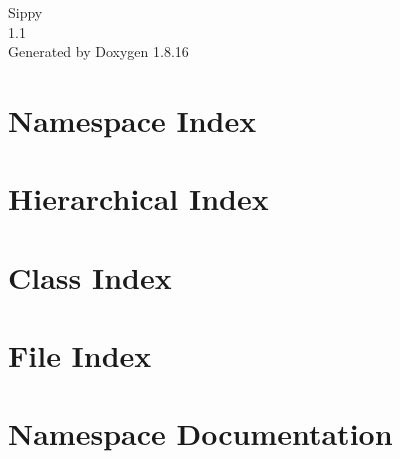 \let\mypdfximage\pdfximage\def\pdfximage{\immediate\mypdfximage}\documentclass[twoside]{book}
\newcommand{\+}{\discretionary{\mbox{\scriptsize$\hookleftarrow$}}{}{}}
\newcommand{\clearemptydoublepage}{%
  \newpage{\pagestyle{empty}\cleardoublepage}%
}
\begin{document}
\hypersetup{pageanchor=false,
             bookmarksnumbered=true,
             pdfencoding=unicode
            }
\begin{titlepage}
\vspace*{7cm}
\begin{center}%
{\Large Sippy \\[1ex]\large 1.\+1 }\\
\vspace*{1cm}
{\large Generated by Doxygen 1.8.16}\\
\end{center}
\end{titlepage}
\clearemptydoublepage
{}
\tableofcontents
\clearemptydoublepage
{}
\hypersetup{pageanchor=true}

\chapter{Namespace Index}

\chapter{Hierarchical Index}

\chapter{Class Index}

\chapter{File Index}

\chapter{Namespace Documentation}






















\end{document}
